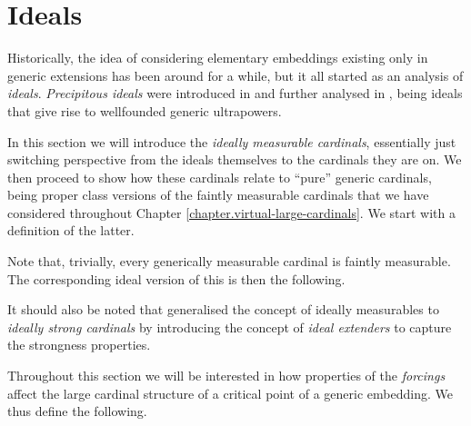 \documentclass[../../main]{subfiles}
\begin{document}
\section{Ideals}

Historically, the idea of considering elementary embeddings existing only in generic extensions has been around for a while, but it all started as an analysis of \textit{ideals}. \textit{Precipitous ideals} were introduced in \cite{IdealGame} and further analysed in \cite{Precipitous}, being ideals that give rise to wellfounded generic ultrapowers.

\qquad In this section we will introduce the \textit{ideally measurable cardinals}, essentially just switching perspective from the ideals themselves to the cardinals they are on. We then proceed to show how these cardinals relate to ``pure'' generic cardinals, being proper class versions of the faintly measurable cardinals that we have considered throughout Chapter \ref{chapter.virtual-large-cardinals}. We start with a definition of the latter.


Note that, trivially, every generically measurable cardinal is faintly measurable. The corresponding ideal version of this is then the following.


It should also be noted that \cite{claverie-ideal-extenders} generalised the concept of ideally measurables to \textit{ideally strong cardinals} by introducing the concept of \textit{ideal extenders} to capture the strongness properties.

\qquad Throughout this section we will be interested in how properties of the \textit{forcings} affect the large cardinal structure of a critical point of a generic embedding. We thus define the following.

\end{document}
